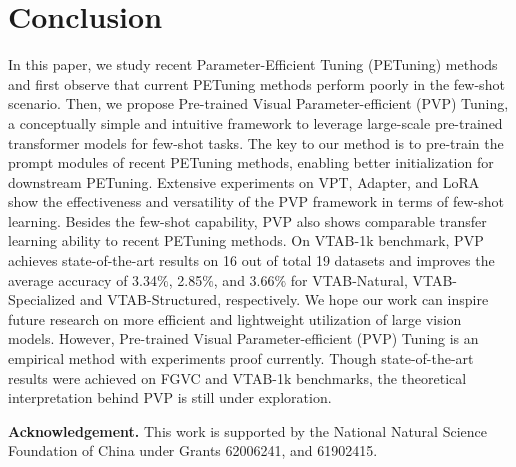 \documentclass[10pt,journal,letterpaper,compsoc]{IEEEtran}
\newcommand{\myPara}[1]{\vspace{10pt}\noindent\textbf{#1.}\quad}
\begin{document}
\section{Conclusion}
In this paper, we study recent Parameter-Efficient Tuning (PETuning) methods and first observe that current PETuning methods perform poorly in the few-shot scenario. Then, we propose Pre-trained Visual Parameter-efficient (PVP) Tuning, a conceptually simple and intuitive framework to leverage large-scale pre-trained transformer models for few-shot tasks. The key to our method is to pre-train the prompt modules of recent PETuning methods, enabling better initialization for downstream PETuning. Extensive experiments on VPT, Adapter, and LoRA show the effectiveness and versatility of the PVP framework in terms of few-shot learning. Besides the few-shot capability, PVP also shows comparable transfer learning ability to recent PETuning methods. On VTAB-1k benchmark, PVP achieves state-of-the-art results on 16 out of total 19 datasets and improves the average accuracy of 3.34$\%$, 2.85$\%$, and 3.66$\%$ for VTAB-Natural, VTAB-Specialized and VTAB-Structured, respectively. We hope our work can inspire future research on more efficient and lightweight utilization of large vision models. However, Pre-trained Visual Parameter-efficient (PVP) Tuning is an empirical method with experiments proof currently. Though state-of-the-art results were achieved on FGVC and VTAB-1k benchmarks, the theoretical interpretation behind PVP is still under exploration.

\myPara{Acknowledgement}
This work is supported by the National Natural Science Foundation of China under Grants 62006241, and 61902415.


\newpage




\vfill
\end{document}
